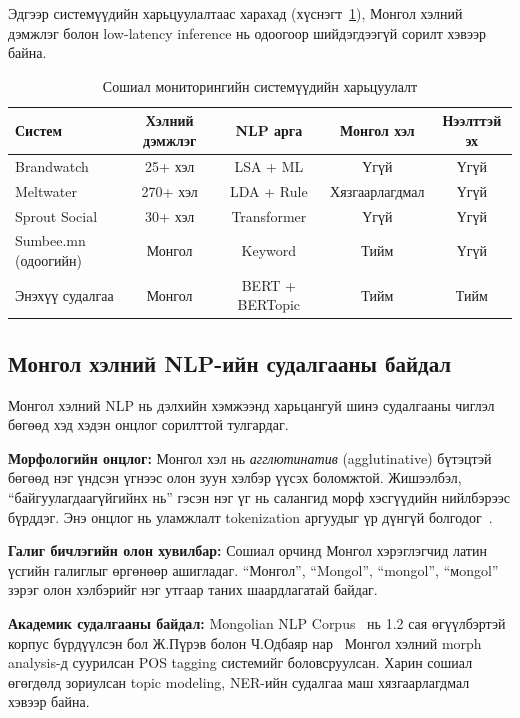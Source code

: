 Эдгээр системүүдийн харьцуулалтаас харахад (хүснэгт~\ref{tab:systems_comparison}), Монгол хэлний дэмжлэг болон low-latency inference нь одоогоор шийдэгдээгүй сорилт хэвээр байна.

\begin{table}[h!]
\centering
\renewcommand{\arraystretch}{1.4}
\begin{tabular}{|l|c|c|c|c|}
\hline
\textbf{Систем} & \textbf{Хэлний дэмжлэг} & \textbf{NLP арга} & \textbf{Монгол хэл} & \textbf{Нээлттэй эх} \\ \hline
Brandwatch & 25+ хэл & LSA + ML & Үгүй & Үгүй \\ \hline
Meltwater & 270+ хэл & LDA + Rule & Хязгаарлагдмал & Үгүй \\ \hline
Sprout Social & 30+ хэл & Transformer & Үгүй & Үгүй \\ \hline
Sumbee.mn (одоогийн) & Монгол & Keyword & Тийм & Үгүй \\ \hline
Энэхүү судалгаа & Монгол & BERT + BERTopic & Тийм & Тийм \\ \hline
\end{tabular}
\caption{Сошиал мониторингийн системүүдийн харьцуулалт}
\label{tab:systems_comparison}
\end{table}

\subsection{Монгол хэлний NLP-ийн судалгааны байдал}

Монгол хэлний NLP нь дэлхийн хэмжээнд харьцангуй шинэ судалгааны чиглэл бөгөөд хэд хэдэн онцлог сорилттой тулгардаг.

\textbf{Морфологийн онцлог:} Монгол хэл нь \textit{агглютинатив} (agglutinative) бүтэцтэй бөгөөд нэг үндсэн үгнээс олон зуун хэлбэр үүсэх боломжтой. Жишээлбэл, ``байгуулагдаагүйгийнх нь'' гэсэн нэг үг нь салангид морф хэсгүүдийн нийлбэрээс бүрддэг. Энэ онцлог нь уламжлалт tokenization аргуудыг үр дүнгүй болгодог~\cite{mongolnlp2020}.

\textbf{Галиг бичлэгийн олон хувилбар:} Сошиал орчинд Монгол хэрэглэгчид латин үсгийн галиглыг өргөнөөр ашигладаг. ``Монгол'', ``Mongol'', ``mongol'', ``мongol'' зэрэг олон хэлбэрийг нэг утгаар таних шаардлагатай байдаг.

\textbf{Академик судалгааны байдал:} Mongolian NLP Corpus~\cite{mongolcorpus2019} нь 1.2 сая өгүүлбэртэй корпус бүрдүүлсэн бол Ж.Пүрэв болон Ч.Одбаяр нар~\cite{purev2008} Монгол хэлний morph analysis-д суурилсан POS tagging системийг боловсруулсан. Харин сошиал өгөгдөлд зориулсан topic modeling, NER-ийн судалгаа маш хязгаарлагдмал хэвээр байна.

